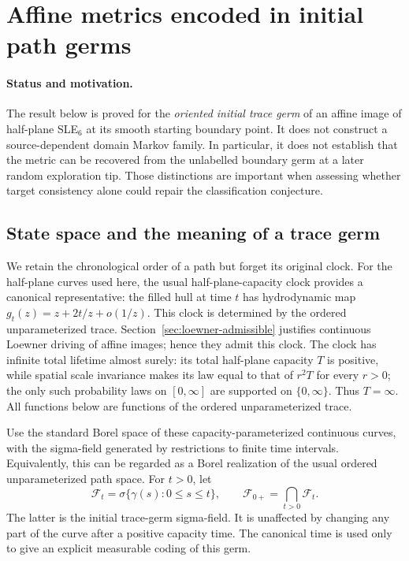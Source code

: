 \documentclass[11pt]{article}
\theoremstyle{definition}\newtheorem{definition}[theorem]{Definition}
\theoremstyle{remark}\newtheorem{remark}[theorem]{Remark}
\begin{document}
\section{Affine metrics encoded in initial path germs}
\label{sec:source-germ-decoder}

\paragraph{Status and motivation.}
The result below is proved for the \emph{oriented initial trace germ} of an
affine image of half-plane SLE$_6$ at its smooth starting boundary point.
It does not construct a source-dependent domain Markov family. In particular,
it does not establish that the metric can be recovered from the unlabelled
boundary germ at a later random exploration tip. Those distinctions are
important when assessing whether target consistency alone could repair the
classification conjecture.

\subsection{State space and the meaning of a trace germ}

We retain the chronological order of a path but forget its original clock.
For the half-plane curves used here, the usual half-plane-capacity clock
provides a canonical representative: the filled hull at time $t$ has
hydrodynamic map $g_t(z)=z+2t/z+o(1/z)$.
This clock is determined by the ordered unparameterized trace. Section~\ref{sec:loewner-admissible} justifies continuous Loewner driving of affine images; hence they admit this clock.
The clock has infinite total lifetime almost surely: its total half-plane
capacity $T$ is positive, while spatial scale invariance makes its law equal
to that of $r^2T$ for every $r>0$; the only such probability laws on
$[0,\infty]$ are supported on $\{0,\infty\}$. Thus $T=\infty$.
All functions below are functions of the ordered unparameterized trace.

Use the standard Borel space of these capacity-parameterized continuous
curves, with the sigma-field generated by restrictions to finite time
intervals. Equivalently, this can be regarded as a Borel realization of the
usual ordered unparameterized path space. For $t>0$, let
\[
 \mathcal F_t=\sigma\{\gamma(s):0\leq s\leq t\},\qquad
 \mathcal F_{0+}=\bigcap_{t>0}\mathcal F_t.
\]
The latter is the initial trace-germ sigma-field. It is unaffected by changing
any part of the curve after a positive capacity time. The canonical time is
used only to give an explicit measurable coding of this germ.
\end{document}
